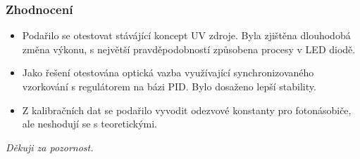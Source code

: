 \documentclass{beamer}
\begin{document}
\begin{frame}
\frametitle{Zhodnocení}
\begin{itemize}
 \item Podařilo se otestovat stávájící koncept UV zdroje. Byla zjištěna dlouhodobá změna výkonu, s největší pravděpodobností způsobena procesy v LED diodě.
 \item Jako řešení otestována optická vazba využívající synchronizovaného vzorkování s regulátorem na bázi PID. Bylo dosaženo lepší stability.
 \item Z kalibračních dat se podařilo vyvodit odezvové konstanty pro fotonásobiče, ale neshodují se s teoretickými.
\end{itemize}

\end{frame}


\begin{frame}{}
  \centering \Large
  \emph{Děkuji za pozornost.}
\end{frame}
\end{document}
